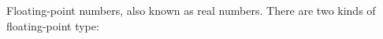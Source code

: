 

\begin{flushleft}
	
	Floating-point numbers, also known as real numbers.
	There are two kinds of floating-point type:
	
	
		
\end{flushleft}

